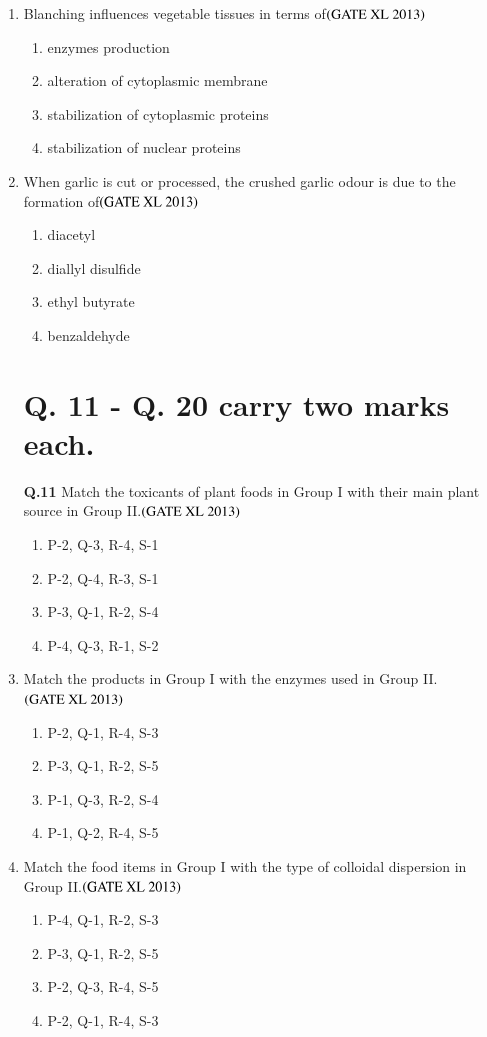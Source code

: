 \documentclass[journal]{IEEEtran}
\begin{document}
\begin{enumerate}
\item Blanching influences vegetable tissues in terms of\hfill $\left(\text{GATE XL 2013}\right)$
\begin{enumerate}
    \item enzymes production
    \item alteration of cytoplasmic membrane
    \item stabilization of cytoplasmic proteins
    \item stabilization of nuclear proteins
\end{enumerate}

\item When garlic is cut or processed, the crushed garlic odour is due to the formation of\hfill $\left(\text{GATE XL 2013}\right)$
\begin{enumerate}
    \item diacetyl
    \item diallyl disulfide
    \item ethyl butyrate
    \item benzaldehyde
\end{enumerate}

\section*{Q. 11 - Q. 20 carry two marks each.}

\textbf{Q.11} Match the toxicants of plant foods in Group I with their main plant source in Group II.\hfill $\left(\text{GATE XL 2013}\right)$
\begin{enumerate}
    \item P-2, Q-3, R-4, S-1
    \item P-2, Q-4, R-3, S-1
    \item P-3, Q-1, R-2, S-4
    \item P-4, Q-3, R-1, S-2
\end{enumerate}

\item Match the products in Group I with the enzymes used in Group II.\hfill $\left(\text{GATE XL 2013}\right)$
\begin{enumerate}
    \item P-2, Q-1, R-4, S-3
    \item P-3, Q-1, R-2, S-5
    \item P-1, Q-3, R-2, S-4
    \item P-1, Q-2, R-4, S-5
\end{enumerate}

\item Match the food items in Group I with the type of colloidal dispersion in Group II.\hfill $\left(\text{GATE XL 2013}\right)$
\begin{enumerate}
    \item P-4, Q-1, R-2, S-3
    \item P-3, Q-1, R-2, S-5
    \item P-2, Q-3, R-4, S-5
    \item P-2, Q-1, R-4, S-3
\end{enumerate}


\end{enumerate}
\end{document}
